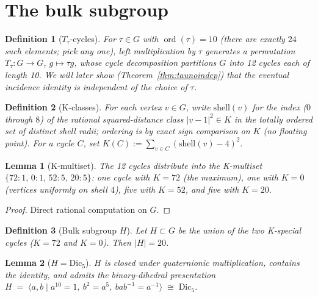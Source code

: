 \documentclass[11pt]{article}
\newtheorem{lemma}{Lemma}[section]
\newtheorem{definition}{Definition}[section]
\newcommand{\Dicfive}{\mathrm{Dic}_5}
\newcommand{\Ttau}{T_\tau}
\begin{document}
\section{The bulk subgroup}\label{sec:bulk}

\begin{definition}[$T_\tau$-cycles]\label{def:Ttau}
For $\tau \in G$ with $\operatorname{ord}(\tau) = 10$ (there are
exactly $24$ such elements; pick any one), left multiplication by
$\tau$ generates a permutation $\Ttau : G \to G$, $g \mapsto \tau g$,
whose cycle decomposition partitions $G$ into 12 cycles each of length
10. We will later show (Theorem~\ref{thm:taunoindep}) that the
eventual incidence identity is independent of the choice of $\tau$.
\end{definition}

\begin{definition}[K-classes]\label{def:Kclass}
For each vertex $v \in G$, write $\mathrm{shell}(v)$ for the index
($0$ through $8$) of the rational squared-distance class
$|v - 1|^2 \in K$ in the totally ordered set of distinct shell radii;
ordering is by exact sign comparison on $K$ (no floating point).
For a cycle $C$, set
\(
  K(C) := \sum_{v \in C}(\mathrm{shell}(v) - 4)^2.
\)
\end{definition}

\begin{lemma}[K-multiset]\label{lem:kmulti}
The 12 cycles distribute into the K-multiset
$\{72{:}1,\, 0{:}1,\, 52{:}5,\, 20{:}5\}$: one cycle with $K = 72$
(the maximum), one with $K = 0$ (vertices uniformly on shell $4$),
five with $K = 52$, and five with $K = 20$.
\end{lemma}

\begin{proof}
Direct rational computation on $G$.
\end{proof}

\begin{definition}[Bulk subgroup $H$]\label{def:bulk}
Let $H \subset G$ be the union of the two K-special cycles ($K = 72$ and
$K = 0$). Then $|H| = 20$.
\end{definition}

\begin{lemma}[$H = \Dicfive$]\label{lem:h_is_dic5}
$H$ is closed under quaternionic multiplication, contains the identity,
and admits the binary-dihedral presentation
\(
  H \;=\; \langle a, b \;|\; a^{10} = 1,\ b^2 = a^5,\ b a b^{-1} = a^{-1} \rangle
  \;\cong\; \Dicfive.
\)
\end{lemma}
\end{document}
